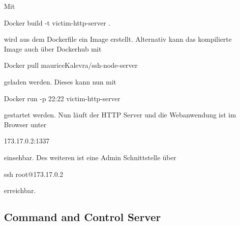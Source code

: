 \documentclass[12pt]{article}
\begin{document}
Mit \colorbox{mshadecolor}{\parbox{0.46\textwidth}{Docker build -t victim-http-server .}} wird aus dem Dockerfile ein Image erstellt. Alternativ kann das kompilierte Image auch über Dockerhub mit \colorbox{mshadecolor}{\parbox{0.58\textwidth}{Docker pull mauriceKalevra/ssh-node-server}} geladen werden. Dieses kann nun mit \colorbox{mshadecolor}{\parbox{0.51\textwidth}{Docker run -p 22:22 victim-http-server}} gestartet werden. Nun läuft der HTTP Server und die Webanwendung ist im Browser unter
\colorbox{mshadecolor}{\parbox{0.20\textwidth}{173.17.0.2:1337}} einsehbar. Des weiteren ist eine Admin Schnittstelle über \colorbox{mshadecolor}{\parbox{0.26\textwidth}{ssh root@173.17.0.2}} erreichbar.
\newpage
\subsection{Command and Control Server}
					
\end{document}
